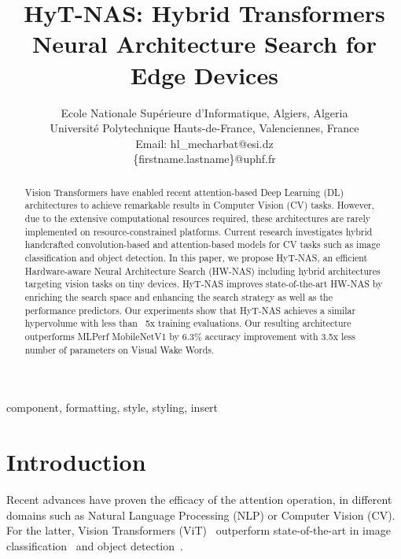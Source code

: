 \documentclass[conference]{IEEEtran}
\begin{document}
\title{HyT-NAS: Hybrid Transformers Neural Architecture Search for Edge Devices\\
}

\author{
Ecole Nationale Supérieure d'Informatique, Algiers, Algeria \\
Université Polytechnique Hauts-de-France, Valenciennes, France \\
Email: 
hl\_mecharbat@esi.dz \\
\{firstname.lastname\}@uphf.fr
}

\maketitle

\begin{abstract}
Vision Transformers have enabled recent attention-based Deep Learning (DL) architectures to achieve remarkable results in Computer Vision (CV) tasks.
However, due to the extensive computational resources required, these architectures are rarely implemented on resource-constrained platforms.
Current research investigates hybrid handcrafted convolution-based and attention-based models for CV tasks such as image classification and object detection.
In this paper, we propose HyT-NAS, an efficient Hardware-aware Neural Architecture Search (HW-NAS) including hybrid architectures targeting vision tasks on tiny devices.
HyT-NAS improves state-of-the-art HW-NAS by enriching the search space and enhancing the search strategy as well as the performance predictors.
Our experiments show that HyT-NAS achieves a similar hypervolume with less than ~5x training evaluations.
Our resulting architecture outperforms MLPerf MobileNetV1 by 6.3\% accuracy improvement with 3.5x less number of parameters on Visual Wake Words.
\end{abstract}

\begin{IEEEkeywords}
component, formatting, style, styling, insert
\end{IEEEkeywords}
\section{Introduction}
\label{sec:introduction}
Recent advances have proven the efficacy of the attention operation, in different domains such as Natural Language Processing (NLP) or Computer Vision (CV). 
For the latter, Vision Transformers (ViT)~\cite{DBLP:conf/iclr/DosovitskiyB0WZ21} outperform state-of-the-art in image  classification~\cite{DBLP:conf/nips/DaiLLT21} and object detection~\cite{DBLP:journals/corr/abs-2203-03605}. 
\end{document}
